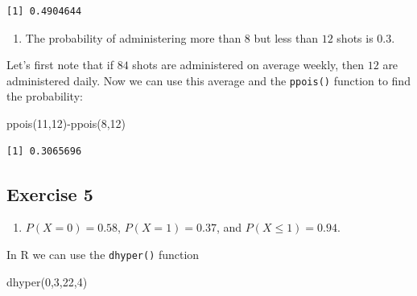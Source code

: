 \documentclass[
  letterpaper,
  DIV=11,
  numbers=noendperiod]{scrreprt}
\newenvironment{Shaded}{\begin{snugshade}}{\end{snugshade}}
\newcommand{\DecValTok}[1]{\textcolor[rgb]{0.68,0.00,0.00}{#1}}
\newcommand{\FunctionTok}[1]{\textcolor[rgb]{0.28,0.35,0.67}{#1}}
\newcommand{\NormalTok}[1]{\textcolor[rgb]{0.00,0.23,0.31}{#1}}
\newcommand{\SpecialCharTok}[1]{\textcolor[rgb]{0.37,0.37,0.37}{#1}}
\providecommand{\tightlist}{%
  \setlength{\itemsep}{0pt}\setlength{\parskip}{0pt}}\usepackage{longtable,booktabs,array}
\begin{document}
\begin{verbatim}
[1] 0.4904644
\end{verbatim}

\begin{blackbox}

\begin{enumerate}
\def\labelenumi{\arabic{enumi}.}
\setcounter{enumi}{2}
\tightlist
\item
  The probability of administering more than \(8\) but less than \(12\)
  shots is \(0.3\).
\end{enumerate}

\end{blackbox}

Let's first note that if \(84\) shots are administered on average
weekly, then \(12\) are administered daily. Now we can use this average
and the \texttt{ppois()} function to find the probability:

\begin{Shaded}
\begin{Highlighting}[numbers=left,,]
\FunctionTok{ppois}\NormalTok{(}\DecValTok{11}\NormalTok{,}\DecValTok{12}\NormalTok{)}\SpecialCharTok{{-}}\FunctionTok{ppois}\NormalTok{(}\DecValTok{8}\NormalTok{,}\DecValTok{12}\NormalTok{)}
\end{Highlighting}
\end{Shaded}

\begin{verbatim}
[1] 0.3065696
\end{verbatim}

\hypertarget{exercise-5-3}{%
\subsection*{Exercise 5}\label{exercise-5-3}}

\begin{blackbox}

\begin{enumerate}
\def\labelenumi{\arabic{enumi}.}
\tightlist
\item
  \(P(X=0)=0.58\), \(P(X=1)=0.37\), and \(P(X \leq 1)=0.94\).
\end{enumerate}

\end{blackbox}

In R we can use the \texttt{dhyper()} function

\begin{Shaded}
\begin{Highlighting}[numbers=left,,]
\FunctionTok{dhyper}\NormalTok{(}\DecValTok{0}\NormalTok{,}\DecValTok{3}\NormalTok{,}\DecValTok{22}\NormalTok{,}\DecValTok{4}\NormalTok{)}
\end{Highlighting}
\end{Shaded}
\end{document}
